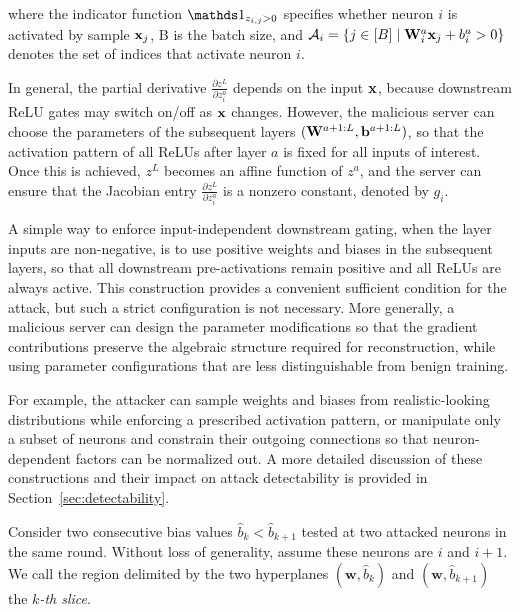 where the indicator function $ \indicator_{z_{i,j}>0}$ specifies whether neuron $i$ is activated by sample ${\mathbf{x}}_j$, B is the batch size, and $\mathcal{A}_i = \{j \in [B] \mid \mathbf{W}_i^a {\mathbf{x}}_j + b_i^a > 0\}$ denotes the set of indices that activate neuron $i$. 

In general, the  partial derivative $\frac{\partial z^L}{\partial z_i^a}$  
depends on the input ${\mathbf{x}}$, because downstream ReLU gates may switch on/off as ${\mathbf{x}}$ changes. 
However, the malicious server can choose the parameters of the subsequent layers $(\mathbf{W}^{a+1:L}, {\mathbf{b}}^{a+1:L})$, so
that the activation pattern of all ReLUs after layer $a$ is fixed for all inputs of interest.
Once this is achieved, $z^L$ becomes an affine function of $z^a$, and the server can ensure that the Jacobian entry $\frac{\partial z^L}{\partial z_i^a}$ is a nonzero constant, denoted by $g_i$.

A simple way to enforce input-independent downstream gating, when the layer inputs are non-negative, is to use positive weights and biases in the subsequent layers, so that all downstream pre-activations remain positive and all ReLUs are always active. This construction provides a convenient sufficient condition for the attack, but such a strict configuration is not necessary. More generally, a malicious server can design the parameter modifications so that the gradient contributions preserve the algebraic structure required for reconstruction, while using parameter configurations that are less distinguishable from benign training. 

For example, the attacker can sample weights and biases from realistic-looking distributions while enforcing a prescribed activation pattern, or manipulate only a subset of neurons and constrain their outgoing connections so that neuron-dependent factors can be normalized out. A more detailed discussion of these constructions and their impact on attack detectability is provided in Section~\ref{sec:detectability}.

Consider two consecutive bias values $\hat b_k < \hat b_{k+1}$ tested at two attacked neurons in the same round. Without loss of generality, assume these neurons are $i$ and $i+1$. We call the region delimited by the two hyperplanes $(\mathbf w,\hat b_k)$ and $(\mathbf w,\hat b_{k+1})$ the \emph{$k$-th slice}.


